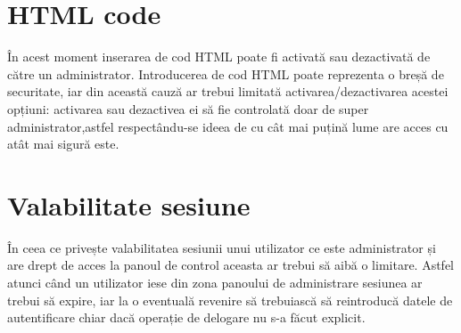 \section{HTML code}

În acest moment inserarea de cod HTML poate fi activată sau dezactivată de către un administrator. Introducerea de cod HTML poate reprezenta o breșă de securitate, iar din această cauză ar trebui limitată activarea/dezactivarea acestei opțiuni: activarea sau dezactivea ei să fie controlată doar de super administrator,astfel respectându-se ideea de cu cât mai puțină lume are acces cu atât mai sigură este.

\section{Valabilitate sesiune}

În ceea ce privește valabilitatea sesiunii unui utilizator ce este administrator și are drept de acces la panoul de control aceasta ar trebui să aibă o limitare. Astfel atunci când un utilizator iese din zona panoului de administrare sesiunea ar trebui să expire, iar la o eventuală revenire să trebuiască să reintroducă datele de autentificare chiar dacă operație de delogare nu s-a făcut explicit.